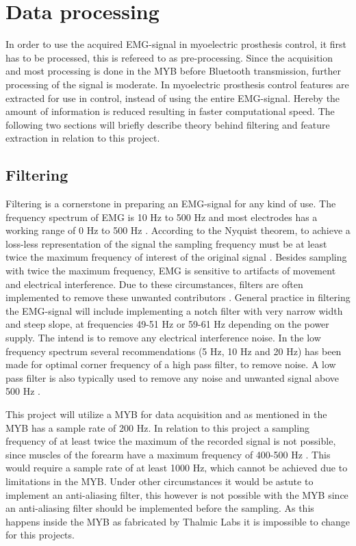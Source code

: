 \section{Data processing} \label{sec:BG:dataProcessing}


In order to use the acquired EMG-signal in myoelectric prosthesis control, it first has to be processed, this is refereed to as pre-processing. Since the acquisition and most processing is done in the MYB before Bluetooth transmission, further processing of the signal is moderate. In myoelectric prosthesis control features are extracted for use in control, instead of using the entire EMG-signal. Hereby the amount of information is reduced resulting in faster computational speed. The following two sections will briefly describe theory behind filtering and feature extraction in relation to this project.  


\subsection{Filtering} \label{sub:BG:filtering} %

Filtering is a cornerstone in preparing an EMG-signal for any kind of use. The frequency spectrum of EMG is 10 Hz to 500 Hz and most electrodes has a working range of 0 Hz to 500 Hz \cite{DeLuca2010}. According to the Nyquist theorem, to achieve a loss-less representation of the signal the sampling frequency must be at least twice the maximum frequency of interest of the original signal \cite{Pozzo2004}. Besides sampling with twice the maximum frequency, EMG is sensitive to artifacts of movement and electrical interference. Due to these circumstances, filters are often implemented to remove these unwanted contributors \cite{DeLuca2010}. 
General practice in filtering the EMG-signal will include implementing a notch filter with very narrow width and steep slope, at frequencies 49-51 Hz or 59-61 Hz depending on the power supply. The intend is to remove any electrical interference noise. In the low frequency spectrum several recommendations (5 Hz, 10 Hz and 20 Hz) has been made for optimal corner frequency of a high pass filter, to remove noise. A low pass filter is also typically used to remove any noise and unwanted signal above 500 Hz \cite{Cram2012}. 

This project will utilize a MYB for data acquisition and as mentioned in  the MYB has a sample rate of 200 Hz. In relation to this project a sampling frequency of at least twice the maximum of the recorded signal is not possible, since muscles of the forearm have a maximum frequency of 400-500 Hz \cite{Cram2012}. This would require a sample rate of at least 1000 Hz, which cannot be achieved due to limitations in the MYB. Under other circumstances it would be astute to implement an anti-aliasing filter, this however is not possible with the MYB since an anti-aliasing filter should be implemented before the sampling. As this happens inside the MYB as fabricated by Thalmic Labs it is impossible to change for this projects. 

